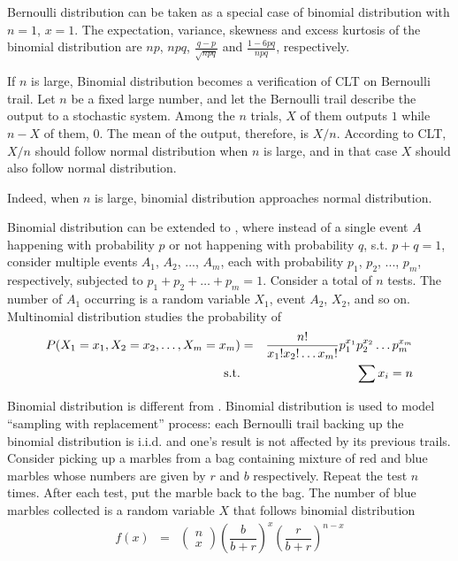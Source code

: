 Bernoulli distribution can be taken as a special case of binomial distribution with $n=1$, $x=1$. The expectation, variance, skewness and excess kurtosis of the binomial distribution are $np$, $npq$, $\frac{q-p}{\sqrt{npq}}$ and $\frac{1-6pq}{npq}$, respectively.

If $n$ is large, Binomial distribution becomes a verification of CLT on Bernoulli trail. Let $n$ be a fixed large number, and let the Bernoulli trail describe the output to a stochastic system. Among the $n$ trials, $X$ of them outputs $1$ while $n-X$ of them, $0$. The mean of the output, therefore, is $X/n$. According to CLT, $X/n$ should follow normal distribution when $n$ is large, and in that case $X$ should also follow normal distribution. 

Indeed, when $n$ is large, binomial distribution approaches normal distribution.

Binomial distribution can be extended to , where instead of a single event $A$ happening with probability $p$ or not happening with probability $q$, s.t. $p+q=1$, consider multiple events $A_1$, $A_2$, ..., $A_m$, each with probability $p_1$, $p_2$, ..., $p_m$, respectively, subjected to $p_1+p_2+\ldots+p_m=1$. Consider a total of $n$ tests. The number of $A_1$ occurring is a random variable $X_1$, event $A_2$, $X_2$, and so on. Multinomial distribution studies the probability of
\begin{eqnarray}
	P(X_1=x_1, X_2=x_2,\ldots, X_m = x_m) &=& \dfrac{n!}{x_1!x_2!\ldots x_m!}p_1^{x_1}p_2^{x_2}\ldots p_m^{x_m} \nonumber \\
	\textup{s.t.} && \sum x_i = n \nonumber
\end{eqnarray}

Binomial distribution is different from . Binomial distribution is used to model ``sampling with replacement'' process: each Bernoulli trail backing up the binomial distribution is i.i.d. and one's result is not affected by its previous trails. Consider picking up a marbles from a bag containing mixture of red and blue marbles whose numbers are given by $r$ and $b$ respectively. Repeat the test $n$ times. After each test, put the marble back to the bag. The number of blue marbles collected is a random variable $X$ that follows binomial distribution
\begin{eqnarray}
	f(x) &=& \left(\begin{array}{c}
		n \\
		x
	\end{array}\right)\left(\dfrac{b}{b+r}\right)^x\left(\dfrac{r}{b+r}\right)^{n-x} \nonumber \nonumber
\end{eqnarray}

